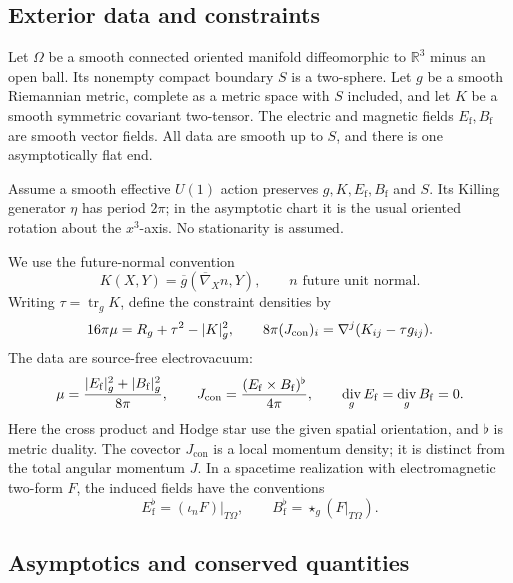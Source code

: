 \documentclass[11pt]{article}
\numberwithin{equation}{section}
\theoremstyle{definition}
\theoremstyle{remark}
\newcommand{\R}{\mathbb R}
\DeclareMathOperator{\tr}{tr}
\DeclareMathOperator{\divg}{div}
\DeclarePairedDelimiter{\abs}{\lvert}{\rvert}
\begin{document}
\subsection{Exterior data and constraints}

Let \(\Omega\) be a smooth connected oriented manifold diffeomorphic to
\(\R^3\) minus an open ball. Its nonempty compact boundary \(S\) is a
two-sphere. Let \(g\) be a smooth Riemannian metric, complete as a metric
space with \(S\) included, and let \(K\) be a smooth symmetric covariant
two-tensor. The electric and magnetic fields \(E_{\mathrm f},B_{\mathrm f}\)
are smooth vector fields. All data are smooth up to \(S\), and there is one
asymptotically flat end.

Assume a smooth effective \(U(1)\) action preserves
\(g,K,E_{\mathrm f},B_{\mathrm f}\) and \(S\). Its Killing generator
\(\eta\) has period \(2\pi\); in the asymptotic chart it is the usual
oriented rotation about the \(x^3\)-axis. No stationarity is assumed.

We use the future-normal convention
\[
 K(X,Y)=\overline g(\overline\nabla_X n,Y),\qquad n\text{ future unit normal}.
\]
Writing \(\tau=\tr_gK\), define the constraint densities by
\begin{equation}\label{m:densities}
 16\pi\mu=R_g+\tau^2-\abs{K}_g^2,\qquad
 8\pi(J_{\mathrm{con}})_i=\nabla^j(K_{ij}-\tau g_{ij}).
\end{equation}
The data are source-free electrovacuum:
\begin{equation}\label{m:electrovac}
 \mu=\frac{\abs{E_{\mathrm f}}_g^2+\abs{B_{\mathrm f}}_g^2}{8\pi},
 \qquad J_{\mathrm{con}}=\frac{(E_{\mathrm f}\mathbin\times B_{\mathrm f})^\flat}{4\pi},
 \qquad \divg_gE_{\mathrm f}=\divg_gB_{\mathrm f}=0.
\end{equation}
Here the cross product and Hodge star use the given spatial orientation, and
\(\flat\) is metric duality. The covector \(J_{\mathrm{con}}\) is a local
momentum density; it is distinct from the total angular momentum \(J\).
In a spacetime realization with electromagnetic two-form \(F\), the induced
fields have the conventions
\begin{equation}\label{m:field-convention}
 E_{\mathrm f}^{\flat}=(\iota_nF)|_{T\Omega},\qquad
 B_{\mathrm f}^{\flat}=\star_g(F|_{T\Omega}).
\end{equation}

\subsection{Asymptotics and conserved quantities}
\end{document}
